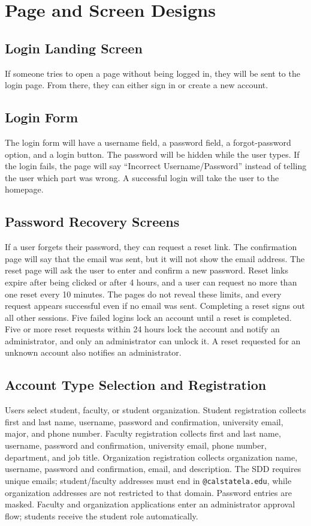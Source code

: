 \newpage %
\section{Page and Screen Designs}
\subsection{Login Landing Screen}
If someone tries to open a page without being logged in, they will be sent to the login page. From there, they can either sign in or create a new account.
\subsection{Login Form}
The login form will have a username field, a password field, a forgot-password option, and a login button. The password will be hidden while the user types. If the login fails, the page will say ``Incorrect Username/Password'' instead of telling the user which part was wrong. A successful login will take the user to the homepage.
\subsection{Password Recovery Screens}
If a user forgets their password, they can request a reset link. The confirmation page will say that the email was sent, but it will not show the email address. The reset page will ask the user to enter and confirm a new password. Reset links expire after being clicked or after 4 hours, and a user can request no more than one reset every 10 minutes. The pages do not reveal these limits, and every request appears successful even if no email was sent. Completing a reset signs out all other sessions. Five failed logins lock an account until a reset is completed. Five or more reset requests within 24 hours lock the account and notify an administrator, and only an administrator can unlock it. A reset requested for an unknown account also notifies an administrator.
\subsection{Account Type Selection and Registration}
Users select student, faculty, or student organization. Student registration collects first and last name, username, password and confirmation, university email, major, and phone number. Faculty registration collects first and last name, username, password and confirmation, university email, phone number, department, and job title. Organization registration collects organization name, username, password and confirmation, email, and description. The SDD requires unique emails; student/faculty addresses must end in \texttt{@calstatela.edu}, while organization addresses are not restricted to that domain. Password entries are masked. Faculty and organization applications enter an administrator approval flow; students receive the student role automatically.
